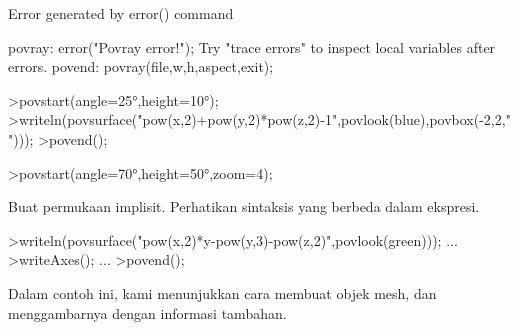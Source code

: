 \documentclass[a4paper,10pt]{article}
\begin{document}
\begin{eulernotebook}
\begin{eulercomment}
\begin{eulercomment}
\begin{eulercomment}
\begin{eulercomment}
\begin{eulercomment}
\begin{eulercomment}
\begin{eulercomment}
\begin{eulercomment}
\begin{eulercomment}
\begin{eulercomment}
\begin{eulercomment}
\begin{eulercomment}
\begin{eulercomment}
\begin{eulercomment}
\begin{eulercomment}
\begin{eulercomment}
\begin{eulercomment}
\begin{eulercomment}
\begin{eulercomment}
\begin{eulercomment}
\begin{eulercomment}
\begin{eulercomment}
\begin{eulercomment}
\begin{eulercomment}
\begin{eulercomment}
\begin{eulercomment}
\begin{eulercomment}
\begin{eulercomment}
\begin{eulercomment}
\begin{eulercomment}
\begin{eulercomment}
\begin{eulercomment}
\begin{eulercomment}
\begin{eulercomment}
\begin{eulercomment}
\begin{eulercomment}
\begin{eulercomment}
\begin{eulercomment}
\begin{eulercomment}
\begin{eulercomment}
\begin{euleroutput}
  Error generated by error() command
  
  povray:
      error("Povray error!");
  Try "trace errors" to inspect local variables after errors.
  povend:
      povray(file,w,h,aspect,exit); 
\end{euleroutput}
\begin{eulerprompt}
>povstart(angle=25°,height=10°); 
>writeln(povsurface("pow(x,2)+pow(y,2)*pow(z,2)-1",povlook(blue),povbox(-2,2,"")));
>povend();
\end{eulerprompt}
\begin{eulerprompt}
>povstart(angle=70°,height=50°,zoom=4);
\end{eulerprompt}
\begin{eulercomment}
Buat permukaan implisit. Perhatikan sintaksis yang berbeda dalam
ekspresi.
\end{eulercomment}
\begin{eulerprompt}
>writeln(povsurface("pow(x,2)*y-pow(y,3)-pow(z,2)",povlook(green))); ...
>writeAxes(); ...
>povend();
\end{eulerprompt}
\begin{eulercomment}
Dalam contoh ini, kami menunjukkan cara membuat objek mesh, dan
menggambarnya dengan informasi tambahan.


\end{eulercomment}
\end{eulercomment}
\end{eulercomment}
\end{eulercomment}
\end{eulercomment}
\end{eulercomment}
\end{eulercomment}
\end{eulercomment}
\end{eulercomment}
\end{eulercomment}
\end{eulercomment}
\end{eulercomment}
\end{eulercomment}
\end{eulercomment}
\end{eulercomment}
\end{eulercomment}
\end{eulercomment}
\end{eulercomment}
\end{eulercomment}
\end{eulercomment}
\end{eulercomment}
\end{eulercomment}
\end{eulercomment}
\end{eulercomment}
\end{eulercomment}
\end{eulercomment}
\end{eulercomment}
\end{eulercomment}
\end{eulercomment}
\end{eulercomment}
\end{eulercomment}
\end{eulercomment}
\end{eulercomment}
\end{eulercomment}
\end{eulercomment}
\end{eulercomment}
\end{eulercomment}
\end{eulercomment}
\end{eulercomment}
\end{eulercomment}
\end{eulercomment}
\end{eulernotebook}
\end{document}
